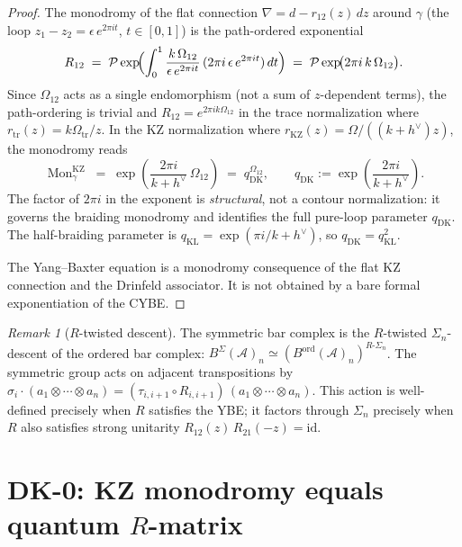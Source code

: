 \documentclass[11pt,reqno]{amsart}
\theoremstyle{definition}
\theoremstyle{remark}
\newtheorem{remark}[theorem]{Remark}
\newcommand{\cA}{\mathcal{A}}
\newcommand{\cP}{\mathcal{P}}
\DeclareMathOperator{\Mon}{Mon}
\newcommand{\id}{\mathrm{id}}
\newcommand{\kp}{k + h^{\vee}}
\numberwithin{equation}{section}
\begin{document}
\begin{proof}
The monodromy of the flat connection
$\nabla = d - r_{12}(z)\,dz$ around $\gamma$
(the loop $z_1 - z_2 = \epsilon\,e^{2\pi it}$,
$t \in [0,1]$) is the path-ordered exponential
\[
R_{12}
\;=\;
\cP\exp\!\Bigl(
\int_0^1
\frac{k\,\Omega_{12}}{\epsilon\,e^{2\pi it}}\,
(2\pi i\,\epsilon\,e^{2\pi it})\,dt
\Bigr)
\;=\;
\cP\exp\!\bigl(
2\pi i\,k\,\Omega_{12}
\bigr).
\]
Since $\Omega_{12}$ acts as a single endomorphism (not a
sum of $z$-dependent terms), the path-ordering is trivial
and $R_{12} = e^{2\pi i k\Omega_{12}}$ in the trace
normalization where $r_{\mathrm{tr}}(z) = k\Omega_{\mathrm{tr}}/z$.
In the KZ normalization where
$r_{\mathrm{KZ}}(z) = \Omega/((\kp) z)$, the monodromy reads
\[
 \Mon_\gamma^{\mathrm{KZ}}
 \;=\;
 \exp\!\left(\frac{2\pi i}{\kp}\,\Omega_{12}\right)
 \;=\;
 q_{\mathrm{DK}}^{\Omega_{12}},
 \qquad
 q_{\mathrm{DK}} := \exp\!\left(\frac{2\pi i}{\kp}\right).
\]
The factor of $2\pi i$ in the exponent is \emph{structural},
not a contour normalization: it governs the braiding monodromy
and identifies the full pure-loop parameter \(q_{\mathrm{DK}}\).
The half-braiding parameter is
\(q_{\mathrm{KL}}=\exp(\pi i/\kp)\), so
\(q_{\mathrm{DK}}=q_{\mathrm{KL}}^2\).

The Yang--Baxter equation is a monodromy consequence of the flat KZ
connection and the Drinfeld associator.  It is not obtained by a bare
formal exponentiation of the CYBE.
\end{proof}

\begin{remark}[$R$-twisted descent]
\label{rem:dk-descent}
The symmetric bar complex is the $R$-twisted
$\Sigma_n$-descent of the ordered bar complex:
$B^{\Sigma}(\cA)_n
\simeq
(B^{\mathrm{ord}}(\cA)_n)^{R\text{-}\Sigma_n}$.
The symmetric group acts on adjacent transpositions by
$\sigma_i \cdot (a_1 \otimes \cdots \otimes a_n)
= (\tau_{i,i+1} \circ R_{i,i+1})\,
(a_1 \otimes \cdots \otimes a_n)$.
This action is well-defined precisely when $R$ satisfies
the YBE; it factors through $\Sigma_n$ precisely when $R$
also satisfies strong unitarity
$R_{12}(z)\,R_{21}(-z) = \id$.
\end{remark}

\section{DK-0: KZ monodromy equals quantum $R$-matrix}
\label{sec:dk0}
\end{document}
